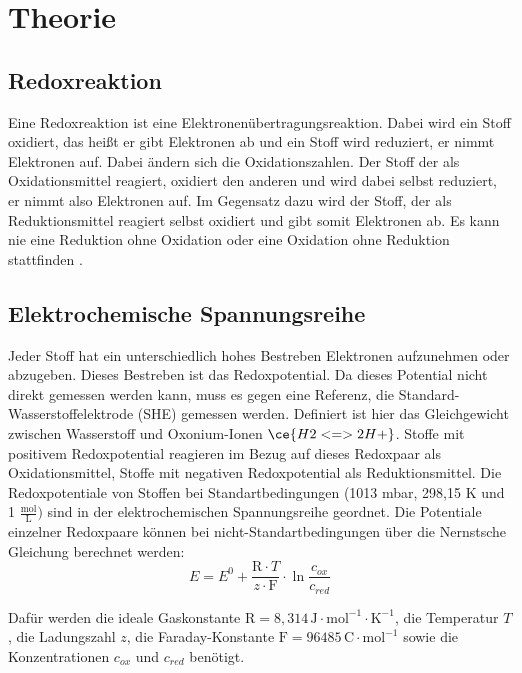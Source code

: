 \documentclass[12pt]{scrartcl} %
\begin{document}

\section{Theorie}
\subsection{Redoxreaktion}
Eine Redoxreaktion ist eine Elektronenübertragungsreaktion. Dabei wird ein Stoff oxidiert, das heißt er gibt Elektronen ab und ein Stoff wird reduziert, er nimmt Elektronen auf. Dabei ändern sich die Oxidationszahlen. 
Der Stoff der als Oxidationsmittel reagiert, oxidiert den anderen und wird dabei selbst reduziert, er nimmt also Elektronen auf. Im Gegensatz dazu wird der Stoff, der als Reduktionsmittel reagiert selbst oxidiert und gibt somit Elektronen ab. Es kann nie eine Reduktion ohne Oxidation oder eine Oxidation ohne Reduktion stattfinden \cite{skript}.

\subsection{Elektrochemische Spannungsreihe}
Jeder Stoff hat ein unterschiedlich hohes Bestreben Elektronen aufzunehmen oder abzugeben. Dieses Bestreben ist das Redoxpotential. Da dieses Potential nicht direkt gemessen werden kann, muss es gegen eine Referenz, die Standard-Wasserstoffelektrode (SHE) gemessen werden. Definiert ist hier das Gleichgewicht zwischen Wasserstoff und Oxonium-Ionen $\ce{H2 <=> 2 H+}$. Stoffe mit positivem Redoxpotential reagieren im Bezug auf dieses Redoxpaar als Oxidationsmittel, Stoffe mit negativen Redoxpotential als Reduktionsmittel. Die Redoxpotentiale von Stoffen bei Standartbedingungen (1013 mbar, 298,15 K und 1 $\frac{\text{mol}}{\text{L}})$ sind in der elektrochemischen Spannungsreihe geordnet. Die Potentiale einzelner Redoxpaare können bei nicht-Standartbedingungen über die Nernstsche Gleichung berechnet werden: \cite{skript}
\begin{equation}
    E = E^0 + \frac{\text{R} \cdot T}{z \cdot \text{F}} \cdot \ln{\frac{c_{ox}}{c_{red}}}
\end{equation}

Dafür werden die ideale Gaskonstante $\text{R} = 8,314 \,\text{J} \cdot \text{mol}^{-1} \cdot \text{K}^{-1}$, die Temperatur $T$, die Ladungszahl $z$, die Faraday-Konstante $\text{F} = 96485\,\text{C} \cdot \text{mol}^{-1}$ sowie die Konzentrationen $c_{ox}$ und $c_{red}$ benötigt.
\end{document}
